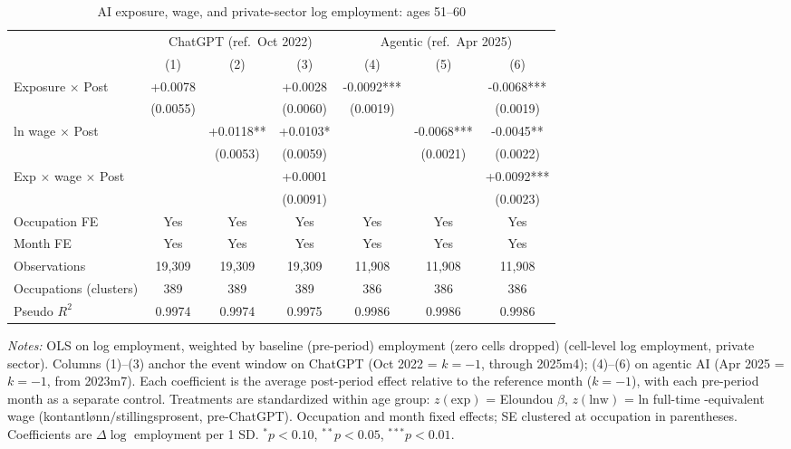 \begin{table}[htbp]\centering
\caption{AI exposure, wage, and private-sector log employment: ages 51–60}
\label{tab:ca_did_age4}
\small
\begin{tabular}{lcccccc}
\toprule
 & \multicolumn{3}{c}{ChatGPT (ref.\ Oct 2022)} & \multicolumn{3}{c}{Agentic (ref.\ Apr 2025)} \\
\cmidrule(lr){2-4} \cmidrule(lr){5-7}
 & (1) & (2) & (3) & (4) & (5) & (6) \\
\midrule
Exposure $\times$ Post & +0.0078 &  & +0.0028 & -0.0092*** &  & -0.0068*** \\
 & (0.0055) &  & (0.0060) & (0.0019) &  & (0.0019) \\
ln wage $\times$ Post &  & +0.0118** & +0.0103* &  & -0.0068*** & -0.0045** \\
 &  & (0.0053) & (0.0059) &  & (0.0021) & (0.0022) \\
Exp $\times$ wage $\times$ Post &  &  & +0.0001 &  &  & +0.0092*** \\
 &  &  & (0.0091) &  &  & (0.0023) \\
\midrule
Occupation FE & Yes & Yes & Yes & Yes & Yes & Yes \\
Month FE & Yes & Yes & Yes & Yes & Yes & Yes \\
Observations & 19,309 & 19,309 & 19,309 & 11,908 & 11,908 & 11,908 \\
Occupations (clusters) & 389 & 389 & 389 & 386 & 386 & 386 \\
Pseudo $R^2$ & 0.9974 & 0.9974 & 0.9975 & 0.9986 & 0.9986 & 0.9986 \\
\bottomrule
\end{tabular}
\begin{minipage}{\linewidth}\vspace{2pt}\footnotesize
\emph{Notes:} OLS on log employment, weighted by baseline (pre-period) employment (zero cells dropped) (cell-level log employment, private sector). Columns (1)--(3) anchor the event window on ChatGPT (Oct 2022 = $k{=}{-}1$, through 2025m4); (4)--(6) on agentic AI (Apr 2025 = $k{=}{-}1$, from 2023m7). Each coefficient is the average post-period effect relative to the reference month ($k{=}{-}1$), with each pre-period month as a separate control. Treatments are standardized within age group: $z(\text{exp})$ = Eloundou $\beta$, $z(\text{lnw})$ = ln full-time -equivalent wage (kontantl\o nn$/$stillingsprosent, pre-ChatGPT). Occupation and month fixed effects; SE clustered at occupation in parentheses. Coefficients are $\Delta\log$ employment per 1 SD. $^{*}p<0.10$, $^{**}p<0.05$, $^{***}p<0.01$.
\end{minipage}
\end{table}